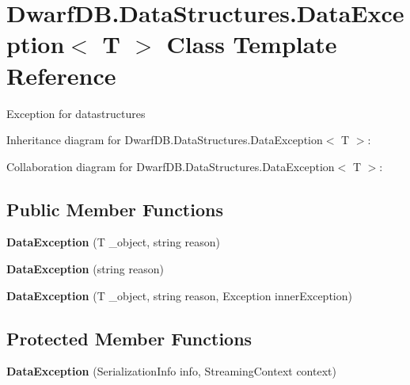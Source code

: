 \hypertarget{class_dwarf_d_b_1_1_data_structures_1_1_data_exception_3_01_t_01_4}{\section{Dwarf\+D\+B.\+Data\+Structures.\+Data\+Exception$<$ T $>$ Class Template Reference}
\label{class_dwarf_d_b_1_1_data_structures_1_1_data_exception_3_01_t_01_4}
}


Exception for datastructures  




Inheritance diagram for Dwarf\+D\+B.\+Data\+Structures.\+Data\+Exception$<$ T $>$\+:


Collaboration diagram for Dwarf\+D\+B.\+Data\+Structures.\+Data\+Exception$<$ T $>$\+:
\subsection*{Public Member Functions}
\begin{DoxyCompactItemize}
\item 
\hypertarget{class_dwarf_d_b_1_1_data_structures_1_1_data_exception_3_01_t_01_4_af4387a96920d83cb65d7e3f16e8722e3}{{\bfseries Data\+Exception} (T \+\_\+object, string reason)}\label{class_dwarf_d_b_1_1_data_structures_1_1_data_exception_3_01_t_01_4_af4387a96920d83cb65d7e3f16e8722e3}

\item 
\hypertarget{class_dwarf_d_b_1_1_data_structures_1_1_data_exception_3_01_t_01_4_ad5c6e96cce65e0b685f01cb18e97360a}{{\bfseries Data\+Exception} (string reason)}\label{class_dwarf_d_b_1_1_data_structures_1_1_data_exception_3_01_t_01_4_ad5c6e96cce65e0b685f01cb18e97360a}

\item 
\hypertarget{class_dwarf_d_b_1_1_data_structures_1_1_data_exception_3_01_t_01_4_a800b1e19b9ca32978883d206a8c9683e}{{\bfseries Data\+Exception} (T \+\_\+object, string reason, Exception inner\+Exception)}\label{class_dwarf_d_b_1_1_data_structures_1_1_data_exception_3_01_t_01_4_a800b1e19b9ca32978883d206a8c9683e}

\end{DoxyCompactItemize}
\subsection*{Protected Member Functions}
\begin{DoxyCompactItemize}
\item 
\hypertarget{class_dwarf_d_b_1_1_data_structures_1_1_data_exception_3_01_t_01_4_a23f040d93fb5573f115041b9bfc4d75e}{{\bfseries Data\+Exception} (Serialization\+Info info, Streaming\+Context context)}\label{class_dwarf_d_b_1_1_data_structures_1_1_data_exception_3_01_t_01_4_a23f040d93fb5573f115041b9bfc4d75e}

\end{DoxyCompactItemize}
